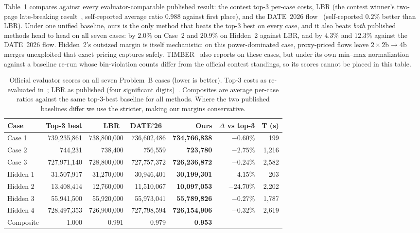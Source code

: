 Table~\ref{tab:main} compares against every evaluator-comparable published result: the contest top-3 per-case costs, LBR (the contest winner's two-page late-breaking result~\cite{li2025lbr}, self-reported average ratio 0.988 against first place), and the DATE~2026 flow~\cite{chen2026agile} (self-reported $0.2\%$ better than LBR). Under one unified baseline, ours is the only method that beats the top-3 best on every case, and it also beats \emph{both} published methods head to head on all seven cases: by $2.0\%$ on Case~2 and $20.9\%$ on Hidden~2 against LBR, and by $4.3\%$ and $12.3\%$ against the DATE~2026 flow. Hidden~2's outsized margin is itself mechanistic: on this power-dominated case, proxy-priced flows leave $2{\times}2\mathrm{b}{\to}4\mathrm{b}$ merges unexploited that exact pricing captures safely. TIMBER~\cite{dassarma2026timber} also reports on these cases, but under its own min--max normalization against a baseline re-run whose bin-violation counts differ from the official contest standings, so its scores cannot be placed in this table.

\begin{table}[t]
\centering
\caption{Official evaluator scores on all seven Problem~B cases (lower is better). Top-3 costs as re-evaluated in~\cite{chen2026agile}; LBR as published (four significant digits)~\cite{li2025lbr}. Composites are average per-case ratios against the same top-3-best baseline for all methods. Where the two published baselines differ we use the stricter, making our margins conservative.}
\label{tab:main}
\small
\begin{tabular}{@{}lrrrrrr@{}}
\toprule
Case & Top-3 best & LBR~\cite{li2025lbr} & DATE'26~\cite{chen2026agile} & Ours & $\Delta$ vs top-3 & T (s) \\
\midrule
Case 1   & 739{,}235{,}861 & 738{,}800{,}000 & 736{,}602{,}486 & \textbf{734{,}766{,}838} & $-0.60\%$ & 199 \\
Case 2   & 744{,}231       & 738{,}400       & 756{,}559       & \textbf{723{,}780}       & $-2.75\%$ & 1{,}216 \\
Case 3   & 727{,}971{,}140 & 728{,}800{,}000 & 727{,}757{,}372 & \textbf{726{,}236{,}872} & $-0.24\%$ & 2{,}582 \\
Hidden 1 & 31{,}507{,}917  & 31{,}270{,}000  & 30{,}946{,}401  & \textbf{30{,}199{,}301}  & $-4.15\%$ & 203 \\
Hidden 2 & 13{,}408{,}414  & 12{,}760{,}000  & 11{,}510{,}067  & \textbf{10{,}097{,}053}  & $-24.70\%$ & 2{,}202 \\
Hidden 3 & 55{,}941{,}500  & 55{,}920{,}000  & 55{,}973{,}041  & \textbf{55{,}789{,}826}  & $-0.27\%$ & 1{,}787 \\
Hidden 4 & 728{,}497{,}353 & 726{,}900{,}000 & 727{,}798{,}594 & \textbf{726{,}154{,}906} & $-0.32\%$ & 2{,}619 \\
\midrule
Composite & 1.000 & 0.991 & 0.979 & \textbf{0.953} & & \\
\bottomrule
\end{tabular}
\end{table}

